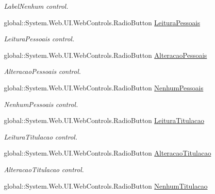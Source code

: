 \begin{DoxyCompactItemize}
\begin{DoxyCompactList}\small\item\em LabelNenhum control. \item\end{DoxyCompactList}\item 
global::System.Web.UI.WebControls.RadioButton \hyperlink{class_sistema_r_h_1_1_cadastro_user_aebe687cb1296669e740ba400287861d4}{LeituraPessoais}
\begin{DoxyCompactList}\small\item\em LeituraPessoais control. \item\end{DoxyCompactList}\item 
global::System.Web.UI.WebControls.RadioButton \hyperlink{class_sistema_r_h_1_1_cadastro_user_a9874f855765f57c9d29cb9aec040237f}{AlteracaoPessoais}
\begin{DoxyCompactList}\small\item\em AlteracaoPessoais control. \item\end{DoxyCompactList}\item 
global::System.Web.UI.WebControls.RadioButton \hyperlink{class_sistema_r_h_1_1_cadastro_user_ac6a633e5e73cd93d92f3c269ee98b678}{NenhumPessoais}
\begin{DoxyCompactList}\small\item\em NenhumPessoais control. \item\end{DoxyCompactList}\item 
global::System.Web.UI.WebControls.RadioButton \hyperlink{class_sistema_r_h_1_1_cadastro_user_ae4fb6be405068ea2ae744a63799a4a83}{LeituraTitulacao}
\begin{DoxyCompactList}\small\item\em LeituraTitulacao control. \item\end{DoxyCompactList}\item 
global::System.Web.UI.WebControls.RadioButton \hyperlink{class_sistema_r_h_1_1_cadastro_user_ae60cafd69a6fb8646a6e934bcb01e418}{AlteracaoTitulacao}
\begin{DoxyCompactList}\small\item\em AlteracaoTitulacao control. \item\end{DoxyCompactList}\item 
global::System.Web.UI.WebControls.RadioButton \hyperlink{class_sistema_r_h_1_1_cadastro_user_afe9c666ae3a9054f5816e78228440256}{NenhumTitulacao}

\end{DoxyCompactItemize}
